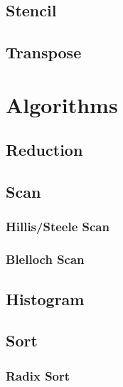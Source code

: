 \documentclass[12px,oz]{report}
\begin{document}
	\section{Stencil}
	\label{sec-stencil}
	
	
	\section{Transpose}
	\label{sec-transpose}
	
	
\chapter{Algorithms}
\label{ch:algorithms}


	\section{Reduction}
	\label{sec:al_reduction}
	
	
	\section{Scan}
	\label{sec:al_scan}
	
	
		\subsection{Hillis/Steele Scan}
		\label{sec:al_scan_hillis_steele}
		
		
		\subsection{Blelloch Scan}
		\label{sec:al_scan_blelloch}
		
	
	\section{Histogram}
	\label{sec:al_histogram}
	
	
	\section{Sort}
	\label{sec:al_sort}
	
	
		\subsection{Radix Sort}
		\label{sec:al_sort_radix}
		
\end{document}
